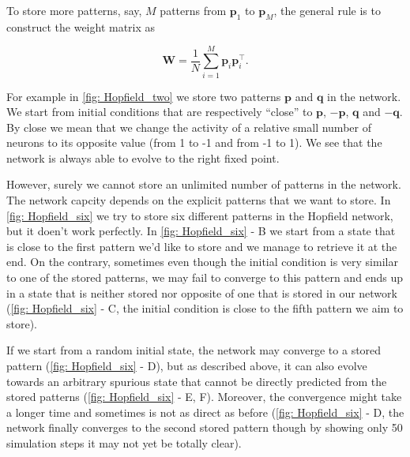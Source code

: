 To store more patterns, say, $M$ patterns from $\mathbf{p}_1$ to 
$\mathbf{p}_M$, the general rule is to construct the weight matrix as

\[\mathbf{W} = \frac{1}{N} \sum_{i=1}^M \mathbf{p}_i\mathbf{p}_i^{\top}.\]

\noindent
For example in \autoref{fig: Hopfield_two} we store two patterns $\mathbf{p}$
and $\mathbf{q}$ in the network. We start from 
initial conditions that are respectively ``close'' to $\mathbf{p}$,
$-\mathbf{p}$, $\mathbf{q}$ and $-\mathbf{q}$. By close we mean that we change
the activity of a relative small number of neurons to its opposite value 
(from 1 to -1 and from -1 to 1). We see that the network is always able
to evolve to the right fixed point.

However, surely we cannot store an unlimited number of patterns in the 
network. The network capcity depends on the explicit patterns that we want
to store. In \autoref{fig: Hopfield_six} we try to store six different 
patterns in the Hopfield network, but it doen't work perfectly.
In \autoref{fig: Hopfield_six} - \textsf{B} we start from a state that is
close to the first pattern we'd like to store and we manage to retrieve it
at the end. On the contrary, sometimes even though the initial condition 
is very similar to one of the stored patterns, we may fail to converge to 
this pattern and ends up in a state that is neither stored nor opposite of 
one that is stored in our network (\autoref{fig: Hopfield_six} -
\textsf{C}, the initial condition is close to the fifth pattern we aim to
store).

If we start from a random initial state, the network may converge to
a stored pattern (\autoref{fig: Hopfield_six} - \textsf{D}), but as
described above, it can also evolve towards an arbitrary spurious state
that cannot be directly predicted from the stored patterns
(\autoref{fig: Hopfield_six} - \textsf{E, F}). Moreover, the convergence
might take a longer time and sometimes is not as direct as before 
(\autoref{fig: Hopfield_six} - \textsf{D}, the network finally converges
to the second stored pattern though by showing only 50 simulation steps it may 
not yet be totally clear).

